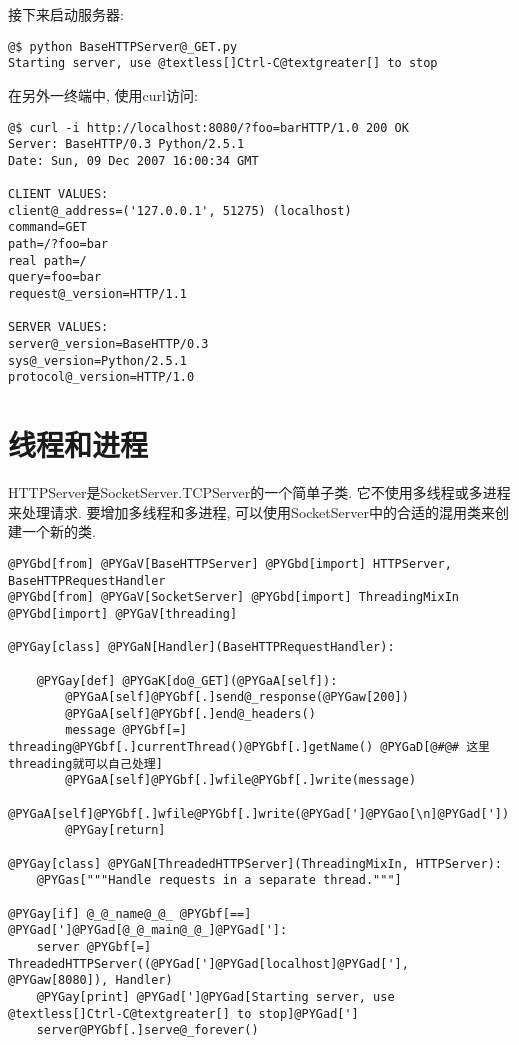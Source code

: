 \documentclass[a4paper,10pt,english]{manual}
\begin{document}
接下来启动服务器:

\begin{Verbatim}[commandchars=@\[\]]
@$ python BaseHTTPServer@_GET.py
Starting server, use @textless[]Ctrl-C@textgreater[] to stop
\end{Verbatim}

在另外一终端中, 使用curl访问:

\begin{Verbatim}[commandchars=@\[\]]
@$ curl -i http://localhost:8080/?foo=barHTTP/1.0 200 OK
Server: BaseHTTP/0.3 Python/2.5.1
Date: Sun, 09 Dec 2007 16:00:34 GMT

CLIENT VALUES:
client@_address=('127.0.0.1', 51275) (localhost)
command=GET
path=/?foo=bar
real path=/
query=foo=bar
request@_version=HTTP/1.1

SERVER VALUES:
server@_version=BaseHTTP/0.3
sys@_version=Python/2.5.1
protocol@_version=HTTP/1.0
\end{Verbatim}


\section{线程和进程}

HTTPServer是SocketServer.TCPServer的一个简单子类. 它不使用多线程或多进程来处理请求. 要增加多线程和多进程, 可以使用SocketServer中的合适的混用类来创建一个新的类.

\begin{Verbatim}[commandchars=@\[\]]
@PYGbd[from] @PYGaV[BaseHTTPServer] @PYGbd[import] HTTPServer, BaseHTTPRequestHandler
@PYGbd[from] @PYGaV[SocketServer] @PYGbd[import] ThreadingMixIn
@PYGbd[import] @PYGaV[threading]

@PYGay[class] @PYGaN[Handler](BaseHTTPRequestHandler):

    @PYGay[def] @PYGaK[do@_GET](@PYGaA[self]):
        @PYGaA[self]@PYGbf[.]send@_response(@PYGaw[200])
        @PYGaA[self]@PYGbf[.]end@_headers()
        message @PYGbf[=] threading@PYGbf[.]currentThread()@PYGbf[.]getName() @PYGaD[@#@# 这里threading就可以自己处理]
        @PYGaA[self]@PYGbf[.]wfile@PYGbf[.]write(message)
        @PYGaA[self]@PYGbf[.]wfile@PYGbf[.]write(@PYGad[']@PYGao[\n]@PYGad['])
        @PYGay[return]

@PYGay[class] @PYGaN[ThreadedHTTPServer](ThreadingMixIn, HTTPServer):
    @PYGas["""Handle requests in a separate thread."""]

@PYGay[if] @_@_name@_@_ @PYGbf[==] @PYGad[']@PYGad[@_@_main@_@_]@PYGad[']:
    server @PYGbf[=] ThreadedHTTPServer((@PYGad[']@PYGad[localhost]@PYGad['], @PYGaw[8080]), Handler)
    @PYGay[print] @PYGad[']@PYGad[Starting server, use @textless[]Ctrl-C@textgreater[] to stop]@PYGad[']
    server@PYGbf[.]serve@_forever()
\end{Verbatim}
\end{document}
